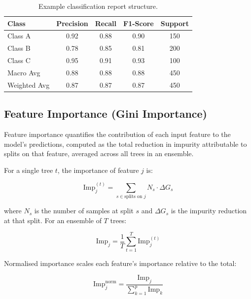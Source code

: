 \documentclass[10pt,a4paper]{article}
\begin{document}
\begin{table}[H]
\centering
\caption{Example classification report structure.}
\label{tab:classification-report}
\begin{tabular}{lcccc}
\toprule
\textbf{Class} & \textbf{Precision} & \textbf{Recall} & \textbf{F1-Score} & \textbf{Support} \\
\midrule
Class A & 0.92 & 0.88 & 0.90 & 150 \\
Class B & 0.78 & 0.85 & 0.81 & 200 \\
Class C & 0.95 & 0.91 & 0.93 & 100 \\
\midrule
Macro Avg & 0.88 & 0.88 & 0.88 & 450 \\
Weighted Avg & 0.87 & 0.87 & 0.87 & 450 \\
\bottomrule
\end{tabular}
\end{table}

\subsection{Feature Importance (Gini Importance)}
\label{sec:feature-importance}

Feature importance quantifies the contribution of each input feature to the model's predictions, computed as the total reduction in impurity attributable to splits on that feature, averaged across all trees in an ensemble.

For a single tree $t$, the importance of feature $j$ is:

\begin{equation}
\text{Imp}_j^{(t)} = \sum_{s \in \text{splits on } j} N_s \cdot \Delta G_s
\label{eq:feature-importance-tree}
\end{equation}

where $N_s$ is the number of samples at split $s$ and $\Delta G_s$ is the impurity reduction at that split. For an ensemble of $T$ trees:

\begin{equation}
\text{Imp}_j = \frac{1}{T} \sum_{t=1}^{T} \text{Imp}_j^{(t)}
\label{eq:feature-importance-ensemble}
\end{equation}

Normalised importance scales each feature's importance relative to the total:

\begin{equation}
\text{Imp}_j^{\text{norm}} = \frac{\text{Imp}_j}{\sum_{k=1}^{p} \text{Imp}_k}
\label{eq:feature-importance-normalised}
\end{equation}
\end{document}
